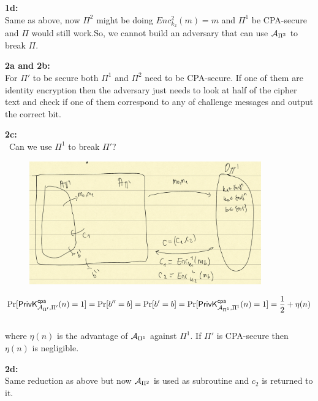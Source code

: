 \documentclass[12pt]{article}
\begin{document}
\textbf{1d:}\\
Same as above, now $\Pi^2$ might be doing $Enc_{k_2}^2(m)=m$ and $\Pi^1$ be CPA-secure and $\Pi$ would still work.So, we cannot build an adversary that can use $\A_{\Pi^2}$ to break $\Pi$.


\textbf{2a and 2b:}\\
For $\Pi'$ to be secure both $\Pi^1$ and $\Pi^2$ need to be CPA-secure. If one of them are identity encryption then the adversary just needs to look at half of the cipher text and check if one of them correspond to any of challenge messages and output the correct bit.

\textbf{2c:}\\
\
Can we use $\Pi^1$ to break $\Pi'$?
\begin{figure}[h]
    \centering
    \includegraphics[width=10cm]{figures/f4.png}
\end{figure}

\[ \Pr[\PrivKcpa[\A_{\Pi'}, \Pi'](n)=1] = \Pr[b''=b] = \Pr[b'=b] = \Pr[\PrivKcpa[\A_{\Pi^1}, \Pi^1](n)=1] = \frac12 + \eta(n) \]\\
where $\eta(n)$ is the advantage of $\A_{\Pi^1}$ against $\Pi^1$. If  $\Pi'$ is CPA-secure then $\eta(n)$ is negligible.

\textbf{2d:}\\
Same reduction as above but now $\A_{\Pi^2}$ is used as subroutine and $c_2$ is returned to it.
\end{document}
